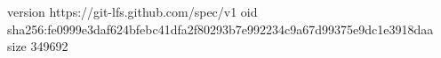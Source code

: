 version https://git-lfs.github.com/spec/v1
oid sha256:fe0999e3daf624bfebc41dfa2f80293b7e992234c9a67d99375e9dc1e3918daa
size 349692
